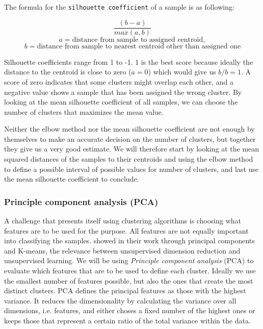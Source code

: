 The formula for the \texttt{silhouette coefficient} of a sample is as following:

\[
	\frac{(b - a)}{max(a, b)}
\]
\[
	a = \text{distance from sample to assigned centroid},
\]
\[
	b = \text{distance from sample to nearest centroid other than assigned one}
\]

Silhouette coefficients range from 1 to -1. 1 is the best score because ideally the distance to the centroid is close to zero (\(a = 0\)) which would give us \(b / b = 1\). A score of zero indicates that some clusters might overlap each other, and a negative value shows a sample that has been assigned the wrong cluster. By looking at the mean silhouette coefficient of all samples, we can choose the number of clusters that maximizes the mean value.

Neither the elbow method nor the mean silhouette coefficient are not enough by themselves to make an accurate decision on the number of clusters, but together they give us a very good estimate. We will therefore start by looking at the mean squared distances of the samples to their centroids and using the elbow method to define a possible interval of possible values for number of clusters, and last use the mean silhouette coefficient to conclude.



\subsubsection{Principle component analysis (PCA)}

A challenge that presents itself using clustering algorithms is choosing what features are to be used for the purpose. All features are not equally important into classifying the samples. \textcite{Ding2004} showed in their work through principal components and K-means, the relevance between unsupervised dimension reduction and unsupervised learning. We will be using \emph{Principle component analysis} (PCA) to evaluate which features that are to be used to define each cluster. Ideally we use the smallest number of features possible, but also the ones that create the most distinct clusters. PCA defines the principal features as those with the highest variance. It reduces the dimensionality by calculating the variance over all dimensions, i.e. features, and either choses a fixed number of the highest ones or keeps those that represent a certain ratio of the total variance within the data.

%
%


